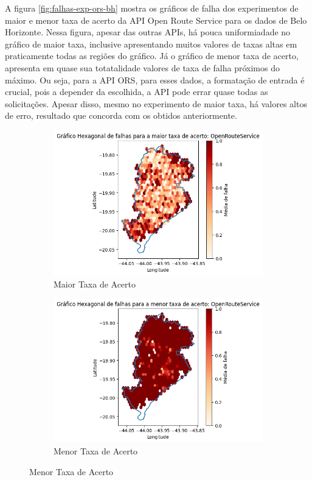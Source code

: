 A figura \ref{fig:falhas-exp-ors-bh} mostra os gráficos de falha dos experimentos de maior e menor taxa de acerto da API Open Route Service para os dados de Belo Horizonte. Nessa figura, apesar das outras APIs, há pouca uniformiadade no gráfico de maior taxa, inclusive apresentando muitos valores de taxas altas em praticamente todas as regiões do gráfico. Já o gráfico de menor taxa de acerto, apresenta em quase sua totatalidade valores de taxa de falha próximos do máximo. Ou seja, para a API ORS, para esses dados, a formatação de entrada é crucial, pois a depender da escolhida, a API pode errar quase todas as solicitações. Apesar disso, mesmo no experimento de maior taxa, há valores altos de erro, resultado que concorda com os obtidos anteriormente.

\begin{figure}[ht]
  \centering
  \begin{subfigure}[b]{0.45\textwidth}
    \includegraphics[width=\textwidth]{Figuras/expFalhasORSmaior.png}
    \caption{Maior Taxa de Acerto}
    \label{fig:falhasorsBHexpMaior}
  \end{subfigure}
  \hfill
  \begin{subfigure}[b]{0.45\textwidth}
    \includegraphics[width=\textwidth]{Figuras/expFalhasORSmenor.png}
    \caption{Menor Taxa de Acerto}
    \label{fig:falhasorsBHexpMenor}
  \end{subfigure}
  

\end{figure}
